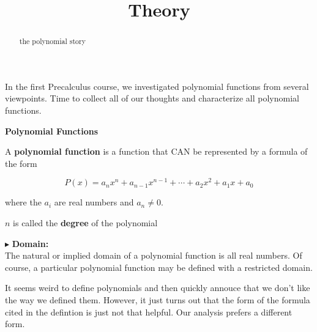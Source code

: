 \documentclass{ximera}
\title{Theory}
\begin{document}
\begin{abstract}
the polynomial story
\end{abstract}
\maketitle







In the first Precalculus course, we investigated polynomial functions from several viewpoints.  Time to collect all of our thoughts and characterize all polynomial functions.





\begin{definition} \textbf{\textcolor{green!50!black}{Polynomial Functions}} 


A \textbf{polynomial function} is a function that CAN be represented by a formula of the form


\[   P(x) = a_n x^n + a_{n-1} x^{n-1} + \cdots + a_2 x^2 + a_1 x + a_0        \]

where the $a_i$ are real numbers and $a_n \ne 0$.

$n$ is called the \textbf{degree} of the polynomial


\end{definition}



$\blacktriangleright$ \textbf{\textcolor{red!10!blue!90!}{Domain:}} \\ 
The natural or implied domain of a polynomial function is all real numbers.  Of course, a particular polynomial function may be defined with a restricted domain.



It seems weird to define polynomials and then quickly annouce that we don't like the way we defined them. However, it just turns out that the form of the formula cited in the defintion is just not that helpful.  Our analysis prefers a different form. \\
\end{document}
